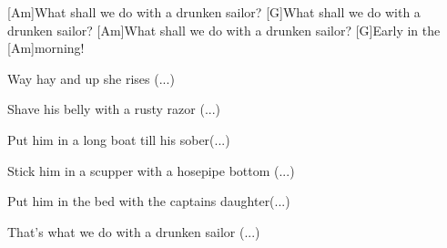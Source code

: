 



\begin{guitar}
	[Am]What shall we do with a drunken sailor?
	[G]What shall we do with a drunken sailor?
	[Am]What shall we do with a drunken sailor?
	[G]Early in the [Am]morning!
	
	Way hay and up she rises (...)
	
	Shave his belly with a rusty razor (...)
	
	Put him in a long boat till his sober(...)
	
	Stick him in a scupper with a hosepipe bottom (...)
	
	Put him in the bed with the captains daughter(...)
	
	That's what we do with a drunken sailor (...)
\end{guitar}